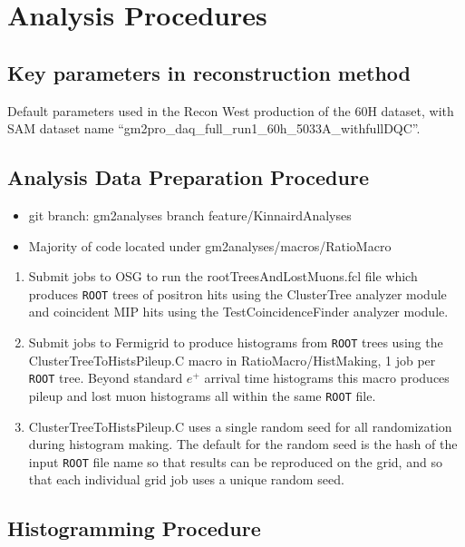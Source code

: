 \graphicspath{ {Figures/CBO/Frequency/} {Figures/VW/} }

\chapter{Analysis Procedures}
\label{Ch:Procedures}


\section{Key parameters in reconstruction method}

	Default parameters used in the Recon West production of the 60H dataset, with SAM dataset name ``gm2pro\_daq\_full\_run1\_60h\_5033A\_withfullDQC''.

\section{Analysis Data Preparation Procedure}

	\begin{itemize}
		\item{git branch: gm2analyses branch feature/KinnairdAnalyses}
		\item{Majority of code located under gm2analyses/macros/RatioMacro}
	\end{itemize}

	\begin{enumerate}
		\item{Submit jobs to OSG to run the rootTreesAndLostMuons.fcl file which produces \texttt{ROOT} trees of positron hits using the ClusterTree analyzer module and coincident MIP hits using the TestCoincidenceFinder analyzer module.}
		\item{Submit jobs to Fermigrid to produce histograms from \texttt{ROOT} trees using the ClusterTreeToHistsPileup.C macro in RatioMacro/HistMaking, 1 job per \texttt{ROOT} tree. Beyond standard $e^{+}$ arrival time histograms this macro produces pileup and lost muon histograms all within the same \texttt{ROOT} file.}
		\item{ClusterTreeToHistsPileup.C uses a single random seed for all randomization during histogram making. The default for the random seed is the hash of the input \texttt{ROOT} file name so that results can be reproduced on the grid, and so that each individual grid job uses a unique random seed.}
	\end{enumerate}


\section{Histogramming Procedure}

